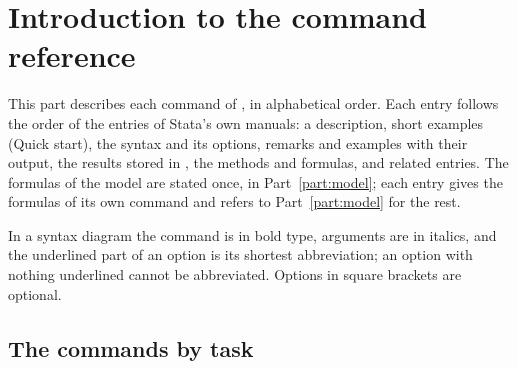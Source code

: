 \chapter*{Introduction to the command reference}\label{ref:intro}

This part describes each command of \pkg, in alphabetical order. Each entry
follows the order of the entries of Stata's own manuals: a description, short
examples (Quick start), the syntax and its options, remarks and examples with
their output, the results stored in , the methods and formulas, and
related entries. The formulas of the model are stated once, in
Part~\ref{part:model}; each entry gives the formulas of its own command and
refers to Part~\ref{part:model} for the rest.

In a syntax diagram the command is in bold type, arguments are in italics, and
the underlined part of an option is its shortest abbreviation; an option with
nothing underlined cannot be abbreviated. Options in square brackets are
optional.

\section*{The commands by task}

